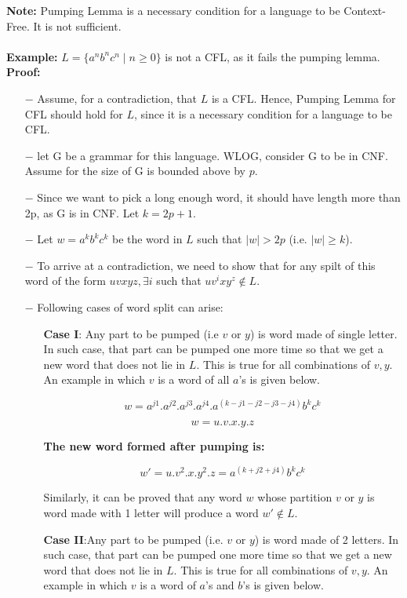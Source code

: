 \documentclass[12pt]{article}
\begin{document}
\textbf{Note:} Pumping Lemma is a necessary condition for a language to be Context-Free. It is not sufficient.
\\ \\
\textbf{Example:} $ L = \{ a^nb^nc^n \mid n \geq 0 \}$ is not a CFL, as it fails the pumping lemma.
\textbf{Proof:}
\begin{itemize}
   \item[ $-$ ] Assume, for a contradiction, that $ L $ is a CFL. Hence, Pumping Lemma for CFL should hold for $ L $, since it is a necessary condition for a language to be CFL.
   \item[ $-$ ] let G be a grammar for this language. WLOG, consider G to be in CNF. Assume for the size of G is bounded above by $ p $.
   \item[ $-$ ] Since we want to pick a long enough word, it should have length more than 2p, as G is in CNF. Let $ k = 2p + 1 $.
   \item[ $-$ ] Let $ w = a^kb^kc^k $ be the word in $ L $ such that $ |w| > 2p $ (i.e. $ |w| \geq k $).
   \item[ $-$ ] To arrive at a contradiction, we need to show that for any spilt of this word of the form $ uvxyz, \exists i $ such that $ uv^ixy^z \notin L $.
   \item[ $-$ ] Following cases of word split can arise:
   \item[ ] \begin{itemize}
         \item[] \textbf{Case I}: Any part to be pumped (i.e $v$ or $y$) is word made of single letter. In such case, that part can be pumped one more time so that we get a new word that does not lie in $L$. This is true for all combinations of $v,y$. An example in which $v$ is a word of all $a$'s is given below.

            \[ w = a^{j1}.a^{j2}.a^{j3}.a^{j4}.a^{(k-j1-j2-j3-j4)}b^kc^k \]

            \[w = u.v.x.y.z\]

            \textbf{The new word formed after pumping is:}

            \[w' = u.v^2.x.y^2.z = a^{(k+j2+j4)}b^kc^k\]

            Similarly, it can be proved that any word $ w $ whose partition $ v $ or $ y $ is word made with 1 letter will produce a word $ w' \notin L $.

         \item[] \textbf{Case II}:Any part to be pumped (i.e. $v$ or $y$) is word made of 2 letters. In such case,
            that part can be pumped one more time so that we get a new word that does not lie in $L$. This is true for all combinations of $v,y$. An example in which $v$ is a word of $a$'s and $b$'s is given below.


\end{itemize}
\end{itemize}
\end{document}
